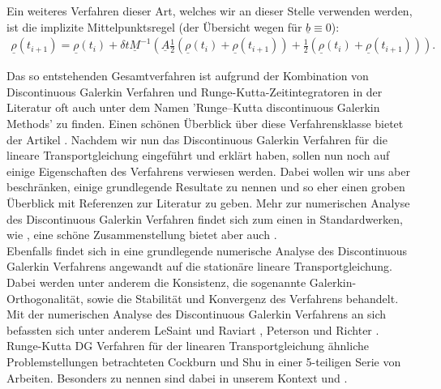 Ein weiteres Verfahren dieser Art, welches wir an dieser Stelle verwenden werden, ist die implizite Mittelpunktsregel (der Übersicht wegen für $\underline{b} \equiv 0$):
\begin{align*}
\underline{\rho}(t_{i+1}) = \underline{\rho}(t_{i}) +
\delta t \underline{M}^{-1} (
\underline{A} 
\frac{1}{2}(\underline{\rho}(t_{i}) +
\underline{\rho}(t_{i+1}) )
+
\frac{1}{2} ( \underline{\rho}(t_{i}) +
\underline{\rho}(t_{i+1}) )).
\end{align*}

Das so entstehenden Gesamtverfahren ist aufgrund der Kombination von Discontinuous Galerkin Verfahren und Runge-Kutta-Zeitintegratoren in der Literatur oft auch unter dem Namen 'Runge–Kutta discontinuous Galerkin Methods' zu finden. Einen schönen Überblick über diese Verfahrensklasse bietet der Artikel \cite{cockburn2001runge}.
Nachdem wir nun das Discontinuous Galerkin Verfahren für die lineare Transportgleichung eingeführt und erklärt haben, sollen nun noch auf einige Eigenschaften des Verfahrens verwiesen werden. Dabei wollen wir uns aber beschränken, einige grundlegende Resultate zu nennen und so eher einen groben Überblick mit Referenzen zur Literatur zu geben. Mehr zur numerischen Analyse des Discontinuous Galerkin Verfahren findet sich zum einen in Standardwerken, wie \cite{ern2004theory}, eine schöne Zusammenstellung bietet aber auch
\cite{Har08b}. \\
Ebenfalls findet sich in \cite{Har08b} eine grundlegende numerische Analyse des Discontinuous Galerkin Verfahrens angewandt auf die stationäre lineare Transportgleichung. Dabei werden unter anderem die Konsistenz, die sogenannte Galerkin-Orthogonalität, sowie die Stabilität und Konvergenz des Verfahrens behandelt.
Mit der numerischen Analyse des Discontinuous Galerkin Verfahrens an sich befassten sich unter anderem LeSaint und Raviart \cite{lesaint1974finite}, Peterson \cite{peterson1991note} und Richter \cite{richter1988optimal}.
Runge-Kutta DG Verfahren für der linearen Transportgleichung ähnliche Problemstellungen betrachteten Cockburn und Shu in einer 5-teiligen Serie von Arbeiten. Besonders zu nennen sind dabei in unserem Kontext \cite{cockburn1989tvb} und \cite{cockburn1990runge}.


